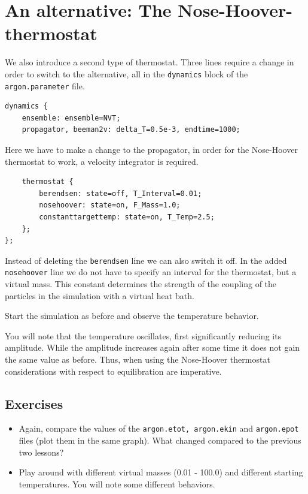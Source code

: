 \section{An alternative: The Nose-Hoover-thermostat} 
We also introduce a second type of thermostat. Three lines require a change in order to switch to the alternative, all in the \texttt{dynamics} block of the \texttt{argon.parameter} file.
\begin{lstlisting}
dynamics {
    ensemble: ensemble=NVT;
    propagator, beeman2v: delta_T=0.5e-3, endtime=1000;
\end{lstlisting}
Here we have to make a change to the propagator, in order for the Nose-Hoover thermostat to work, a velocity integrator is required. 
\begin{lstlisting}
    thermostat {
        berendsen: state=off, T_Interval=0.01;
        nosehoover: state=on, F_Mass=1.0;
        constanttargettemp: state=on, T_Temp=2.5;
    };
};
\end{lstlisting}
Instead of deleting the \texttt{berendsen} line we can also switch it off. 
In the added \texttt{nosehoover} line we do not have to specify an interval
for the thermostat, but a virtual mass. This constant determines the strength
of the coupling of the particles in the simulation with a virtual heat bath. 

Start the simulation as before and observe the temperature behavior.

You will note that the temperature oscillates, first significantly reducing
its amplitude. While the amplitude increases again after some time it does
not gain the same value as before. Thus, when using the Nose-Hoover thermostat
considerations with respect to equilibration are imperative. 

\subsection{Exercises}
\begin{itemize}
\item Again, compare the values of the \texttt{argon.etot, argon.ekin} and \texttt{argon.epot} files (plot them in the same graph). What changed compared to the previous two lessons?
\item Play around with different virtual masses (0.01 - 100.0) and different starting temperatures. You will note some different behaviors.
\end{itemize}


